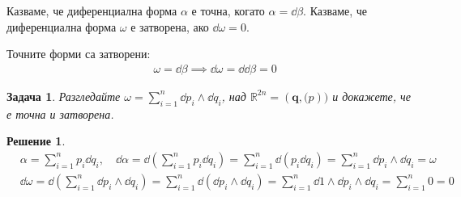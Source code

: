 \documentclass[12pt]{article}
\newtheorem{problem}{Задача}
\newtheorem*{solution*}{Решение}
\begin{document}
\begin{large}
\begin{comment}
\begin{problem}
Докажете, че $\dd \dd f = 0$
\end{problem}

\begin{solution*}
\begin{align*}
&\dd (\dd f) = \dd (\sum_{i=1}^{n} \pdv{f}{x_i} \dd x_i ) = \sum_{i=1}^{n} (\sum_{j=1}^{n} \pdv{f}{x_j, x_i} \dd x_j) \wedge \dd x_i = \sum_{i=1}^{n} \sum_{j\neq i} \pdv{f}{x_j, x_i} \dd x_j \wedge \dd x_i \\
&= \sum_{i=1}^{n} \sum_{j<i} \pdv{f}{x_j, x_i} \dd x_j \wedge \dd x_i + \sum_{i=1}^{n} \sum_{j>i} \pdv{f}{x_j, x_i} \dd x_j \wedge \dd x_i  \\
&= \sum_{i=1}^{n} \sum_{j<i} \pdv{f}{x_j, x_i} \dd x_j \wedge \dd x_i + \sum_{j=1}^{n} \sum_{i<j} \pdv{f}{x_j, x_i} \dd x_j \wedge \dd x_i \\
&= \sum_{i=1}^{n} \sum_{j<i} -\pdv{f}{x_j, x_i} \dd x_i \wedge \dd x_j + \sum_{i=1}^{n} \sum_{j<i} \pdv{f}{x_i, x_j} \dd x_i \wedge \dd x_j \\
&= \sum_{i=1}^{n} \sum_{j<i}(\pdv{f}{x_i, x_j}-\pdv{f}{x_j, x_i}) \dd x_i \wedge \dd x_j = 0 \text{(от теоремата на Шварц)}
\end{align*}
\end{solution*}
\end{comment}


Казваме, че диференциална форма $\alpha$ е точна, когато $\alpha=\dd \beta$.
Казваме, че диференциална форма $\omega$ е затворена, ако $\dd \omega=0$.

Точните форми са затворени:
\begin{align*}
&\omega = \dd \beta \implies \dd \omega = \dd \dd \beta = 0 
\end{align*}

\begin{problem}
Разгледайте $\omega = \sum_{i=1}^n \dd p_i \wedge \dd q_i$, над $\mathbb{R}^{2n}=(\mathbf{q},\mathbf(p))$ и докажете, че е точна и затворена.
\end{problem}

\begin{solution*}
\begin{align*}
&\alpha = \sum_{i=1}^n p_i \dd q_i , \quad \dd \alpha =\dd(\sum_{i=1}^n p_i \dd q_i) = \sum_{i=1}^n \dd(p_i \dd q_i)
= \sum_{i=1}^n \dd p_i \wedge \dd q_i = \omega \\
&\dd \omega = \dd(\sum_{i=1}^n \dd p_i \wedge \dd q_i) =\sum_{i=1}^n \dd(\dd p_i \wedge \dd q_i) = 
\sum_{i=1}^n  \dd 1 \wedge \dd p_i \wedge \dd q_i = \sum_{i=1}^n 0 = 0
\end{align*}
\end{solution*}


\end{large}
\end{document}
